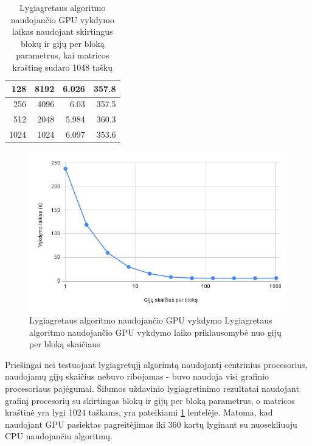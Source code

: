 \documentclass{VUMIFPSbakalaurinis}
\begin{document}
\begin{table}[]
\begin{tabular}{|r|r|r|r|}
        128                                           & 8192                                & 6.026                                  & 357.8                                       \\ \hline
        256                                           & 4096                                & 6.03                                   & 357.5                                       \\ \hline
        512                                           & 2048                                & 5.984                                  & 360.3                                       \\ \hline
        1024                                          & 1024                                & 6.097                                  & 353.6                                       \\ \hline
    \end{tabular}
    \caption{Lygiagretaus algoritmo naudojančio GPU vykdymo laikas naudojant skirtingus blokų ir gijų per bloką parametrus, kai matricos kraštinę sudaro 1048 taškų}
    \label{table:gpu_threads}
\end{table}


\begin{figure}[H]
    \centering
    \includegraphics[scale=0.7]{img/gpu_threads.png}
    \caption{Lygiagretaus algoritmo naudojančio GPU vykdymo Lygiagretaus algoritmo naudojančio GPU vykdymo laiko priklausomybė nuo gijų per bloką skaičiaus}
    \label{img:gpu_threads}
\end{figure}


Priešingai nei testuojant lygiagretųjį algorimtą naudojantį centrinius procesorius, naudojamų gijų skaičius nebuvo ribojamas - buvo naudoja visi grafinio procesoriaus pajėgumai.
Šilumos uždavinio lygiagretinimo rezultatai naudojant grafinį procesorių su skirtingas blokų ir gijų per bloką parametrus, o matricos kraštinė yra lygi 1024 taškams, yra pateikiami \ref{table:gpu_threads} lentelėje. 
Matoma, kad naudojant GPU pasiektas pagreitėjimas iki 360 kartų lyginant su nuosekliuoju CPU naudojančiu algoritmų.
\end{document}
